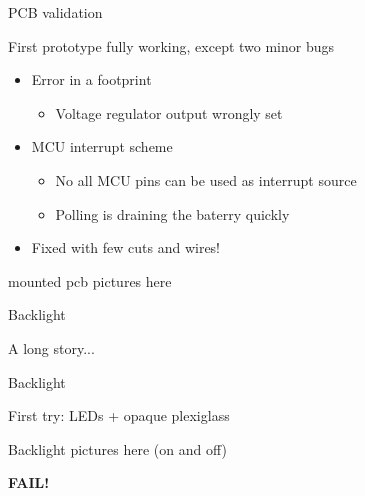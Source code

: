 \documentclass[compress,red]{beamer}
\begin{document}
\begin{frame}{PCB validation}

  First prototype fully working, except two minor bugs

  \begin{itemize}
  \item Error in a footprint
    \begin{itemize}
    \item Voltage regulator output wrongly set
    \end{itemize}
  \item MCU interrupt scheme
    \begin{itemize}
    \item No all MCU pins can be used as interrupt source
    \item Polling is draining the baterry quickly
    \end{itemize}
    \item Fixed with few cuts and wires!
  \end{itemize}

  \begin{center}
    mounted pcb pictures here
  \end{center}

  \note[item]{}

\end{frame}

\begin{frame}{Backlight}

  A long story...

  \note[item]{}

\end{frame}

\begin{frame}{Backlight}

  First try: LEDs + opaque plexiglass

  \begin{center}
    Backlight pictures here (on and off)
  \end{center}

  \textbf{FAIL!}

  \note[item]{}

\end{frame}
\end{document}
